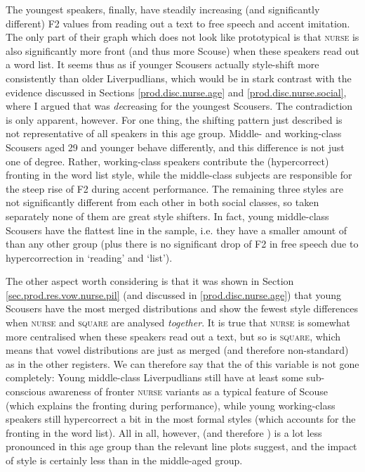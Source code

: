 The youngest speakers, finally, have steadily increasing (and significantly different) F2 values from reading out a text to free speech and accent imitation.
The only part of their graph which does not look like prototypical  is that \textsc{nurse} is also significantly more front (and thus more Scouse) when these speakers read out a word list.
It seems thus as if younger Scousers actually style-shift more consistently than older Liverpudlians, which would be in stark contrast with the evidence discussed in Sections \ref{prod.disc.nurse.age} and \ref{prod.disc.nurse.social}, where I argued that  was \emph{de}creasing for the youngest Scousers.
The contradiction is only apparent, however.
For one thing, the shifting pattern just described is not representative of all speakers in this age group.
Middle- and working-class Scousers aged 29 and younger behave differently, and this difference is not just one of degree.
Rather, working-class speakers contribute the (hypercorrect) fronting in the word list style, while the middle-class subjects are responsible for the steep rise of F2 during accent performance.
The remaining three styles are not significantly different from each other in both social classes, so taken separately none of them are great style shifters.
In fact, young middle-class Scousers have the flattest line in the sample, i.e. they have a smaller amount of  than any other group (plus there is no significant drop of F2 in free speech due to hypercorrection in `reading' and `list').

The other aspect worth considering is that it was shown in Section \ref{sec.prod.res.vow.nurse.pil} (and discussed in \ref{prod.disc.nurse.age}) that young Scousers have the most merged distributions and show the fewest style differences when \textsc{nurse} and \textsc{square} are analysed \emph{together}.
It is true that \textsc{nurse} is somewhat more centralised when these speakers read out a text, but so is \textsc{square}, which means that vowel distributions are just as merged (and therefore non-standard) as in the other registers.
We can therefore say that the  of this variable is not gone completely:
Young middle-class Liverpudlians still have at least some sub-conscious awareness of fronter \textsc{nurse} variants as a typical feature of Scouse (which explains the fronting during performance), while young working-class speakers still hypercorrect a bit in the most formal styles (which accounts for the fronting in the word list).
All in all, however,  (and therefore ) is a lot less pronounced in this age group than the relevant line plots suggest, and the impact of style is certainly less than in the middle-aged group.

